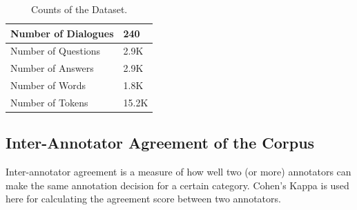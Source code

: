 \documentclass[bsc,frontabs,twoside,singlespacing,parskip,deptreport]{infthesis}     %
\begin{document}
\begin{table}[]
\centering
\begin{tabular}{|l|l|}
\hline
Number of Dialogues & 240   \\ \hline
Number of Questions & 2.9K  \\ \hline
Number of Answers   & 2.9K  \\ \hline
Number of Words     & 1.8K  \\ \hline
Number of Tokens    & 15.2K \\ \hline
\end{tabular}
\caption{Counts of the Dataset.}
\label{tab:datacount}
\end{table}


\subsection{Inter-Annotator Agreement of the Corpus}

Inter-annotator agreement is a measure of how well two (or more) annotators can make the same annotation decision for a certain category. Cohen's Kappa is used here for calculating the agreement score between two annotators.
\end{document}
